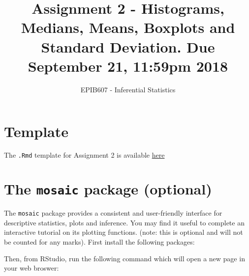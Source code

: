 \documentclass[letterpaper,9pt,twocolumn,twoside,printwatermark=false]{pinp}
\title{Assignment 2 - Histograms, Medians, Means, Boxplots and Standard
Deviation. Due September 21, 11:59pm 2018}
\author[a]{EPIB607 - Inferential Statistics}
\affil[a]{Fall 2018, McGill University}
\begin{document}
\verticaladjustment{-2pt}

\maketitle
\thispagestyle{firststyle}



\section*{Template}\label{template}

The \texttt{.Rmd} template for Assignment 2 is available
\href{sahirbhatnagar.com}{here}

\section{\texorpdfstring{The \texttt{mosaic} package
(optional)}{The mosaic package (optional)}}\label{the-mosaic-package-optional}

The \texttt{mosaic} package provides a consistent and user-friendly
interface for descriptive statistics, plots and inference. You may find
it useful to complete an interactive tutorial on its plotting functions.
(note: this is optional and will not be counted for any marks). First
install the following packages:

\begin{Shaded}
\begin{Highlighting}[]
\NormalTok{(}\NormalTok{(}\NormalTok{,}\NormalTok{), }
                  \NormalTok{)}
\end{Highlighting}
\end{Shaded}

Then, from RStudio, run the following command which will open a new page
in your web broswer:
\end{document}
